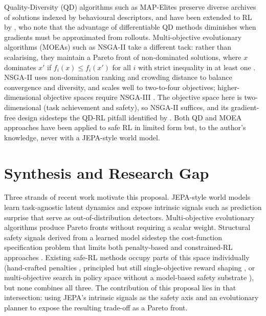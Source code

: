 \documentclass[a4paper,twoside,12pt]{report}
\begin{document}
Quality-Diversity (QD) algorithms such as MAP-Elites \citep{mouret2015mapelites} preserve diverse archives of solutions indexed by behavioural descriptors, and have been extended to RL by \citet{tjanaka2022dqdrl}, who note that the advantage of differentiable QD methods diminishes when gradients must be approximated from rollouts. Multi-objective evolutionary algorithms (MOEAs) such as NSGA-II \citep{deb2002nsga2} take a different tack: rather than scalarising, they maintain a Pareto front of non-dominated solutions, where $x$ dominates $x'$ if $f_i(x) \leq f_i(x')$ for all $i$ with strict inequality in at least one \citep{miettinen1999nonlinear}. NSGA-II uses non-domination ranking and crowding distance to balance convergence and diversity, and scales well to two-to-four objectives; higher-dimensional objective spaces require NSGA-III \citep{deb2014nsga3}. The objective space here is two-dimensional (task achievement and safety), so NSGA-II suffices, and its gradient-free design sidesteps the QD-RL pitfall identified by \citet{tjanaka2022dqdrl}. Both QD and MOEA approaches have been applied to safe RL in limited form \citep{sobal2025stresstest,mouret2023qdsafety} but, to the author's knowledge, never with a JEPA-style world model.

\section{Synthesis and Research Gap}\label{sec:gap}

Three strands of recent work motivate this proposal. JEPA-style world models \citep{lecun2022path,maes2026lewm,zhou2025dinowm} learn task-agnostic latent dynamics and expose intrinsic signals such as prediction surprise that serve as out-of-distribution detectors. Multi-objective evolutionary algorithms \citep{deb2002nsga2} produce Pareto fronts without requiring a scalar weight. Structural safety signals derived from a learned model \citep{garrido2025intuitive,maes2026lewm} sidestep the cost-function specification problem that limits both penalty-based and constrained-RL approaches \citep{achiam2017cpo,skalse2022rewardhacking}. Existing safe-RL methods occupy parts of this space individually (hand-crafted penalties \citep{garcia2015survey,achiam2017cpo}, principled but still single-objective reward shaping \citep{nanguetasse2024rosarl}, or multi-objective search in policy space without a model-based safety substrate \citep{mouret2023qdsafety,tjanaka2022dqdrl}), but none combines all three. The contribution of this proposal lies in that intersection: using JEPA's intrinsic signals as the safety axis and an evolutionary planner to expose the resulting trade-off as a Pareto front.
\end{document}
